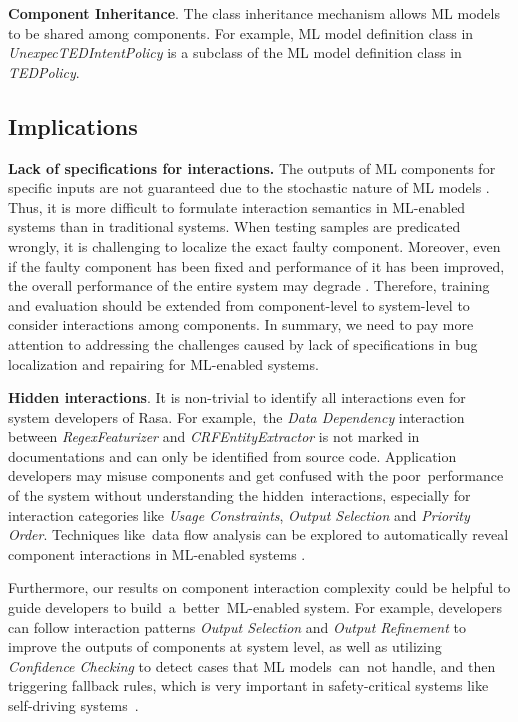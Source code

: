 \textbf{Component Inheritance}. The class inheritance mechanism allows ML models to be shared among components. For example, ML model definition class  in \textit{UnexpecTEDIntentPolicy} is a subclass of the ML model definition class in \textit{TEDPolicy}.

\subsection{Implications}


\textbf{Lack of specifications for interactions.} The outputs of ML components for specific inputs are not guaranteed due to the stochastic nature of ML models  \cite{feature_interaction}. Thus, it is more difficult to formulate interaction semantics in ML-enabled systems than in traditional systems. When testing samples are predicated wrongly, it is challenging to localize the exact faulty component. 
Moreover, even if the faulty component has been fixed and performance of it has been improved, the overall performance of the entire system may degrade \cite{fix_that_fails}. Therefore, training and evaluation should be extended from component-level to system-level to consider interactions among components. 
In summary, we need to pay more attention to addressing the challenges caused by lack of specifications in bug localization and repairing for ML-enabled systems.

\textbf{Hidden interactions}. It is non-trivial to identify all interactions even for system developers of Rasa. 
For example,~the \textit{Data Dependency} interaction between \textit{RegexFeaturizer} and \textit{CRFEntityExtractor} is not marked in documentations and can only be identified from source code.
Application developers may misuse components and get confused with the poor~performance of the system without understanding the hidden~interactions, especially for interaction categories like \textit{Usage Constraints}, \textit{Output Selection} and \textit{Priority Order}.
Techniques like~data flow analysis can be explored to automatically reveal component interactions in ML-enabled systems \cite{Sattler2017LiftingID}.

Furthermore, our results on component interaction complexity could be helpful to guide developers to build~a~better~ML-enabled system.
For example, developers can follow interaction patterns \textit{Output Selection} and \textit{Output Refinement} to improve the outputs of components at system level, as well as utilizing  \textit{Confidence Checking} to detect cases that ML models~can~not handle, and then triggering fallback rules, which is very important in safety-critical systems like self-driving systems~\cite{pengFirstLookIntegration2020}.



